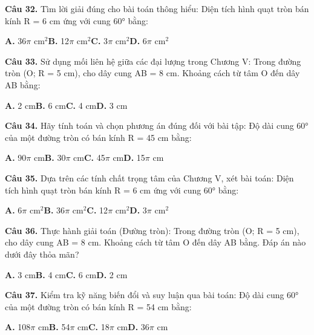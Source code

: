 \documentclass[11pt,a4paper]{article}
\begin{document}
\textbf{\color{primary} Câu 32.} Tìm lời giải đúng cho bài toán thông hiểu: Diện tích hình quạt tròn bán kính R = 6 cm ứng với cung 60° bằng:\par
\hspace*{1.5em}\textbf{A.} 36$\pi$ cm$^2$\quad\quad \textbf{B.} 12$\pi$ cm$^2$\quad\quad \textbf{C.} 3$\pi$ cm$^2$\quad\quad \textbf{D.} 6$\pi$ cm$^2$\par\vspace{2pt}
\textbf{\color{primary} Câu 33.} Sử dụng mối liên hệ giữa các đại lượng trong Chương V: Trong đường tròn (O; R = 5 cm), cho dây cung AB = 8 cm. Khoảng cách từ tâm O đến dây AB bằng:\par
\hspace*{1.5em}\textbf{A.} 2 cm\quad\quad \textbf{B.} 6 cm\quad\quad \textbf{C.} 4 cm\quad\quad \textbf{D.} 3 cm\par\vspace{2pt}
\textbf{\color{primary} Câu 34.} Hãy tính toán và chọn phương án đúng đối với bài tập: Độ dài cung 60° của một đường tròn có bán kính R = 45 cm bằng:\par
\hspace*{1.5em}\textbf{A.} 90$\pi$ cm\quad\quad \textbf{B.} 30$\pi$ cm\quad\quad \textbf{C.} 45$\pi$ cm\quad\quad \textbf{D.} 15$\pi$ cm\par\vspace{2pt}
\textbf{\color{primary} Câu 35.} Dựa trên các tính chất trọng tâm của Chương V, xét bài toán: Diện tích hình quạt tròn bán kính R = 6 cm ứng với cung 60° bằng:\par
\hspace*{1.5em}\textbf{A.} 6$\pi$ cm$^2$\quad\quad \textbf{B.} 36$\pi$ cm$^2$\quad\quad \textbf{C.} 12$\pi$ cm$^2$\quad\quad \textbf{D.} 3$\pi$ cm$^2$\par\vspace{2pt}
\textbf{\color{primary} Câu 36.} Thực hành giải toán (Đường tròn): Trong đường tròn (O; R = 5 cm), cho dây cung AB = 8 cm. Khoảng cách từ tâm O đến dây AB bằng. Đáp án nào dưới đây thỏa mãn?\par
\hspace*{1.5em}\textbf{A.} 3 cm\quad\quad \textbf{B.} 4 cm\quad\quad \textbf{C.} 6 cm\quad\quad \textbf{D.} 2 cm\par\vspace{2pt}
\textbf{\color{primary} Câu 37.} Kiểm tra kỹ năng biến đổi và suy luận qua bài toán: Độ dài cung 60° của một đường tròn có bán kính R = 54 cm bằng:\par
\hspace*{1.5em}\textbf{A.} 108$\pi$ cm\quad\quad \textbf{B.} 54$\pi$ cm\quad\quad \textbf{C.} 18$\pi$ cm\quad\quad \textbf{D.} 36$\pi$ cm\par\vspace{2pt}
\end{document}
